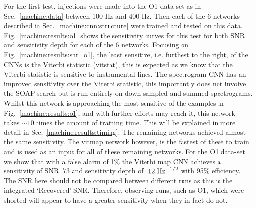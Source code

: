 For the first test, injections were made into the O1 data-set as in Sec.~\ref{machine:data} between 100 Hz and 400 Hz. Then each of the 6 networks described in Sec.~\ref{machine:cnn:structure} were trained and tested on this data. 
Fig.~\ref{machine:results:o1} shows the sensitivity curves for this test for both \gls{SNR} and sensitivity depth for each of the 6 networks. Focusing on Fig.~\ref{machine:results:snr_o1}, the least sensitive, i.e. furthest to the right, of the \glspl{CNN} is the Viterbi statistic (vitstat), this is expected as we know that the Viterbi statistic is sensitive to instrumental lines. 
The spectrogram \gls{CNN} has an improved sensitivity over the Viterbi statistic, this importantly does not involve the SOAP search but is run entirely on down-sampled and summed spectrograms. 
Whilst this network is approaching the most sensitive of the examples in Fig.~\ref{machine:results:o1}, and with further efforts may reach it, this network takes $\sim10$ times the amount of training time. This will be explained in more detail in Sec.~\ref{machine:results:timing}.
The remaining networks achieved almost the same sensitivity. 
The vitmap network however, is the fastest of these to train and is used as an input for all of these remaining networks.
For the O1 data-set we show that with a false alarm of 1\% the Viterbi map \gls{CNN} achieves a sensitivity of SNR $~73$ and sensitivity depth of $~12\; {\rm Hz}^{-1/2}$ with 95\% efficiency.
The \gls{SNR} here should not be compared between different runs as this is the integrated `Recovered' \gls{SNR}. Therefore, observing runs, such as O1, which were shorted will appear to have a greater sensitivity when they in fact do not. 

